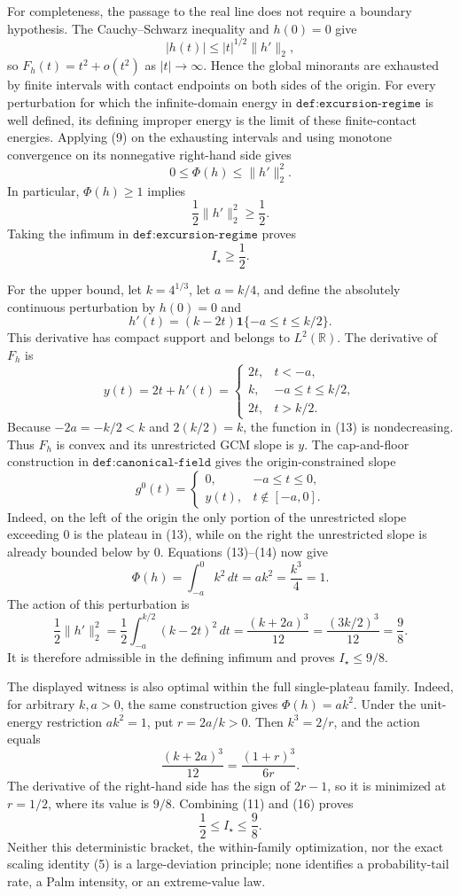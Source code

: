 For completeness, the passage to the real line does not require a boundary hypothesis.  The Cauchy--Schwarz inequality and \(h(0)=0\) give
\[
 |h(t)|\le |t|^{1/2}\lVert h'\rVert_2,
\]
so \(F_h(t)=t^2+o(t^2)\) as \(|t|\to\infty\).  Hence the global minorants are exhausted by finite intervals with contact endpoints on both sides of the origin.  For every perturbation for which the infinite-domain energy in \(\texttt{def:excursion-regime}\) is well defined, its defining improper energy is the limit of these finite-contact energies.  Applying (9) on the exhausting intervals and using monotone convergence on its nonnegative right-hand side gives
\[
 0\le\Phi(h)\le\lVert h'\rVert_2^2. \tag{10}
\]
In particular, \(\Phi(h)\ge1\) implies
\[
 \frac12\lVert h'\rVert_2^2\ge\frac12.
\]
Taking the infimum in \(\texttt{def:excursion-regime}\) proves
\[
 I_\star\ge\frac12. \tag{11}
\]

For the upper bound, let \(k=4^{1/3}\), let \(a=k/4\), and define the absolutely continuous perturbation by \(h(0)=0\) and
\[
 h'(t)=(k-2t)\mathbf 1\{-a\le t\le k/2\}. \tag{12}
\]
This derivative has compact support and belongs to \(L^2(\mathbb R)\).  The derivative of \(F_h\) is
\[
 y(t)=2t+h'(t)=
 \begin{cases}
 2t,&t<-a,\\
 k,&-a\le t\le k/2,\\
 2t,&t>k/2.
 \end{cases} \tag{13}
\]
Because \(-2a=-k/2<k\) and \(2(k/2)=k\), the function in (13) is nondecreasing.  Thus \(F_h\) is convex and its unrestricted GCM slope is \(y\).  The cap-and-floor construction in \(\texttt{def:canonical-field}\) gives the origin-constrained slope
\[
 g^0(t)=
 \begin{cases}
 0,&-a\le t\le0,\\
 y(t),&t\notin[-a,0].
 \end{cases} \tag{14}
\]
Indeed, on the left of the origin the only portion of the unrestricted slope exceeding \(0\) is the plateau in (13), while on the right the unrestricted slope is already bounded below by \(0\).  Equations (13)--(14) now give
\[
 \Phi(h)=\int_{-a}^{0}k^2\,dt=ak^2=\frac{k^3}{4}=1. \tag{15}
\]
The action of this perturbation is
\[
 \frac12\lVert h'\rVert_2^2
 =\frac12\int_{-a}^{k/2}(k-2t)^2\,dt
 =\frac{(k+2a)^3}{12}
 =\frac{(3k/2)^3}{12}
 =\frac98. \tag{16}
\]
It is therefore admissible in the defining infimum and proves \(I_\star\le9/8\).

The displayed witness is also optimal within the full single-plateau family.  Indeed, for arbitrary \(k,a>0\), the same construction gives \(\Phi(h)=ak^2\).  Under the unit-energy restriction \(ak^2=1\), put \(r=2a/k>0\).  Then \(k^3=2/r\), and the action equals
\[
 \frac{(k+2a)^3}{12}=\frac{(1+r)^3}{6r}. \tag{17}
\]
The derivative of the right-hand side has the sign of \(2r-1\), so it is minimized at \(r=1/2\), where its value is \(9/8\).  Combining (11) and (16) proves
\[
 \frac12\le I_\star\le\frac98.
\]
Neither this deterministic bracket, the within-family optimization, nor the exact scaling identity (5) is a large-deviation principle; none identifies a probability-tail rate, a Palm intensity, or an extreme-value law.

